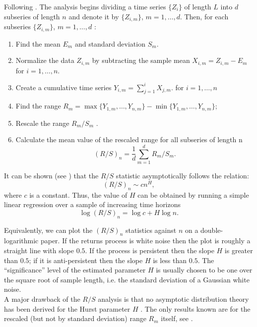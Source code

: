 \documentclass[smallextended]{svjour3}
\begin{document}
Following \cite{we}. The analysis begins  dividing a time series $\{Z_i\}$ of
length $L$ into $d$
subseries of length $n$ and denote it by $\{Z_{i,m}\}$, $m = 1,\ldots,d$. Then,
for each subseries  $\{Z_{i,m}\}$, $m = 1,\ldots,d$ :
\begin{enumerate}
    \item Find the mean $E_m$ and standard deviation $S_m$.
    \item Normalize the data $Z_{i,m}$  by subtracting the sample mean $X_{i,m}
    =Z_{i,m}-E_m$ for $i=1,\ldots,n$.
    \item Create a cumulative time series $Y_{i,m} = \sum_{j=1}^i X_{j,m}$.
    for $i = 1,\ldots,n$
    \item Find the range $R_m = \max\{Y_{1,m},\ldots, Y_{n,m}\} -
    \min\{Y_{1,m},\ldots, Y_{n,m} \}$;
    \item Rescale the range $R_m/S_m$ .

    \item Calculate the mean value of the rescaled range
    for all subseries of length n
    \[
    (R/S)_n =\frac{1}{d}\sum_{m=1}^d  R_m /S_m.
    \]
\end{enumerate}

It can be shown (see \cite{we}) that the $R/S$ statistic asymptotically follows
the relation:
\[
(R/S)_n \sim c n^H,
\]
where $c$ is a constant. Thus, the value of $H$ can be obtained by running a
simple linear regression over a
sample of increasing time horizons
\[
\log(R/S)_n = \log c + H \log n.
\]


Equivalently, we can plot the $(R/S)_n$ statistics against $n$ on a
double-logarithmic paper.
If the returns process is white noise then the plot is roughly a straight line
with slope $0.5$. If the process is persistent then the slope $H$ is greater
than $ 0.5$; if it is anti-persistent
then the slope $H$ is less than  $0.5$. The “significance” level of the
estimated parameter $H$ is usually chosen to be one over the
square root of sample length, i.e. the standard deviation of a Gaussian white
noise.\\



A major drawback of the $R/S$ analysis is  that no asymptotic distribution
theory has been derived for the Hurst parameter $H$ . The only results known
are for
the rescaled (but not by standard deviation) range $R_m$ itself, see \cite{lo}.
\end{document}
